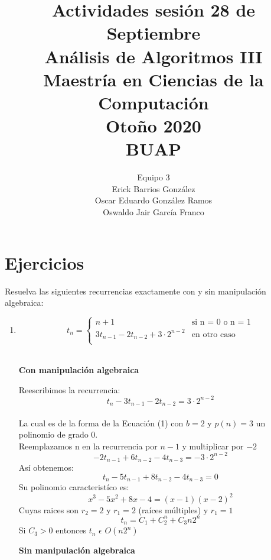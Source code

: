 \documentclass{article}
\title{Actividades sesi\'on 28 de Septiembre\\
An\'alisis de Algoritmos III\\
Maestr\'ia en Ciencias de la Computaci\'on\\ 
Oto\~{n}o 2020\\
BUAP
}
\author{Equipo 3\\
  \small Erick Barrios Gonz\'alez\\
  \small Oscar Eduardo Gonz\'alez Ramos\\
  \small Oswaldo Jair Garc\'ia Franco
}
\theoremstyle{definition}
\theoremstyle{remark}
\begin{document}
\maketitle
\clearpage

\section{Ejercicios}
Resuelva las siguientes recurrencias exactamente con y sin manipulaci\'on algebraica:\\
\begin{enumerate}[1.]
\item  $$t_n = \left \{ 
\begin{matrix} 
n + 1 & \mbox{si n = }0\mbox{ o n = 1}\\ 
3t_{n-1}-2t_{n-2}+3 \cdot 2^{n-2} & \mbox{en}\mbox{ otro caso}\\
\end{matrix}
\right. $$\\

\begin{center}
\textbf{Con manipulaci\'on algebraica}\\
\end{center}

Reescribimos la recurrencia: \\
$$ t_{n}-3t_{n-1}-2t_{n-2} = 3 \cdot 2^{n-2} $$\\
La cual es de la forma de la Ecuaci\'on (1) con $b=2$ y $p(n)=3$ un polinomio de grado 0.\\
Reemplazamos n en la recurrencia por $n-1$ y multiplicar por $-2$\\
$$ -2t_{n-1} + 6t_{n-2} - 4t_{n-3} = - 3 \cdot 2^{n-2}	$$
As\'i obtenemos: \\
$$ t_{n} - 5t_{n-1} + 8t_{n-2} - 4t_{n-3} = 0$$
Su polinomio caracterist\'ico es:
$$ x^{3} - 5x^{2} + 8x - 4 = (x-1)(x-2)^{2}$$
Cuyas raices son $ r_{2} = 2 $ y $r_{1} = 2$ (ra\'ices m\'ultiples) y $r_{1}=1$\\

$$t_n= C_{1} + C_{2}^{n} + C_{3}n2^{n}$$
Si $C_{3}>0$ entonces $t_{n}$ $\epsilon$ $O(n2^{n})$\\
\clearpage

\begin{center}
\textbf{Sin manipulaci\'on algebraica}\\
\end{center}


\end{enumerate}
\end{document}
